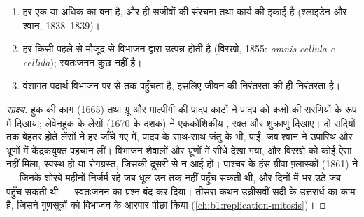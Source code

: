 \begin{proposition}[कोशिका सिद्धांत]\label{prop:b1:cell-unit-of-life:theory}
\begin{enumerate}
  \item हर  एक या अधिक  का बना है, और  ही सजीवों की
        संरचना तथा कार्य की इकाई है
        (श्लाइडेन और श्वान, 1838--1839)।
  \item हर  किसी पहले से मौजूद  से विभाजन द्वारा उत्पन्न
        होती है (विरखो, 1855: \emph{omnis cellula e cellula}); स्वतःजनन
        कुछ नहीं है।
  \item वंशागत पदार्थ विभाजन पर  से  तक पहुँचता है, इसलिए
        जीवन की निरंतरता  की ही निरंतरता है।
\end{enumerate}
\end{proposition}
\begin{proof}[साक्ष्य]
हुक की काग (1665) तथा ग्रू और माल्पीगी की पादप काटों ने पादप  को
कक्षों की सरणियों के रूप में दिखाया; लेवेनहुक के लेंसों (1670 के दशक) ने
एककोशिकीय , रक्त  और शुक्राणु दिखाए। दो सदियों तक बेहतर होते
लेंसों ने हर जाँचे गए  में, पादप के साथ-साथ जंतु के भी, 
पाईं, जब श्वान ने उपास्थि और भ्रूणों में केंद्रकयुक्त  पहचान
लीं। विभाजन शैवालों और भ्रूणों में सीधे देखा गया, और विरखो को कोई ऐसा
 नहीं मिला, स्वस्थ हो या रोगग्रस्त, जिसकी  दूसरी  से
न आई हों। पाश्चर के हंस-ग्रीवा फ़्लास्कों (1861) ने --- जिनके शोरबे
महीनों निर्जर्म रहे जब धूल उन तक नहीं पहुँच सकती थी, और दिनों में भर उठे
जब पहुँच सकती थी --- स्वतःजनन का प्रश्न बंद कर दिया। तीसरा कथन उन्नीसवीं
सदी के उत्तरार्ध का काम है, जिसने गुणसूत्रों को विभाजन के आरपार पीछा
किया (\cref{ch:b1:replication-mitosis})।
\end{proof}

